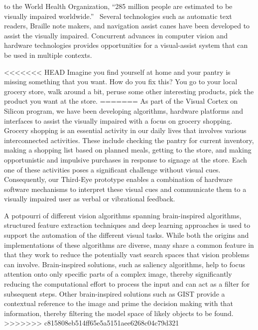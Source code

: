 to the World Health Organization, ``285 million people are estimated
to be visually impaired worldwide.''~\cite{WHOvisuallyimpaired}
Several technologies such as automatic text readers, Braille note
makers, and navigation assist canes have been developed to assist the
visually impaired. Concurrent advances in computer vision and hardware
technologies provides opportunities for a visual-assist system that
can be used in multiple contexts.

<<<<<<< HEAD
Imagine you find yourself at home and your pantry is missing something that you want. How do you fix this? You go to your local grocery store, walk around a bit, peruse some other interesting products, pick the product you want at the store. 
=======
As part of the Visual Cortex on Silicon program, we have been
developing algorithms, hardware platforms and interfaces to assist the
visually impaired with a focus on grocery shopping. Grocery shopping
is an essential activity in our daily lives that involves various
interconnected activities. These include checking the pantry for
current inventory, making a shopping list based on planned meals,
getting to the store, and making opportunistic and impulsive purchases
in response to signage at the store. Each one of these activities
poses a significant challenge without visual cues.  Consequently, our
Third-Eye prototype enables a combination of hardware software
mechanisms to interpret these visual cues and communicate them to a
visually impaired user as verbal or vibrational feedback.

A potpourri of different vision algorithms spanning brain-inspired
algorithms, structured feature extraction techniques and deep learning
approaches is used to support the automation of the different visual
tasks. While both the origins and implementations of these algorithms
are diverse, many share a common feature in that they work to reduce
the potentially vast search spaces that vision problems can
involve. Brain-inspired solutions, such as saliency algorithms, help
to focus attention onto only specific parts of a complex image,
thereby significantly reducing the computational effort to process the
input and can act as a filter for subsequent steps.  Other
brain-inspired solutions such as GIST provide a contextual reference
to the image and prime the decision making with that information,
thereby filtering the model space of likely objects to be found.
>>>>>>> c815808eb514ff65e5a5151aee6268c04c79d321

